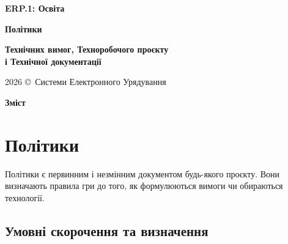 \documentclass{article}
\newcommand\HUGE[1]{\fontsize{40}{40}\selectfont #1}
\begin{document}
\pagestyle{fancy}

\begin{titlepage}
  \AddToShipoutPictureBG*{\AtPageLowerLeft{\color{nato}\rule{\paperwidth}{\paperheight}}}
  \color{white}\thispagestyle{empty}\vspace*{4cm}\centering
  {\Huge  \textbf{ERP.1: Освіта} \par} \vspace{2cm}
  {\HUGE  \textbf{Політики} \par} \vspace{2.5cm}
  {\LARGE \textbf{Технічних вимог, Техноробочого проєкту \\ і Технічної документації} \par} \vspace{2.5cm}
  \vfill
  {\large 2026 \copyright\ Системи Електронного Урядування \par}
\end{titlepage}

\newpage

\begin{center}
  {\Huge\color{nato}\bfseries Зміст\par}
\end{center}
\vspace{40pt}
\tableofcontents

\begin{abstract}
  У статті подаються універсальні засади політик проектів для
  державних ІТ підприємств, типовий зміст технічних вимог з повною таксономією підрозділів та
  структурою технічного завдання відповідно до ДСТУ.
  Показані принципи, як політики визначають вимоги, що узгоджують технічне завдання та посилання на ключові
  державні стандарти документування ДСТУ. Матеріал призначений для архітекторів, аналітиків та розробників,
  які працюють над державними та комерційними проєктами в Україні.
\end{abstract}

\newpage

\section{Політики}

Політики є первинним і незмінним документом будь-якого проєкту.
Вони визначають правила гри до того, як формулюються вимоги чи обираються технології.

\subsection*{Умовні скорочення та визначення}
\end{document}
